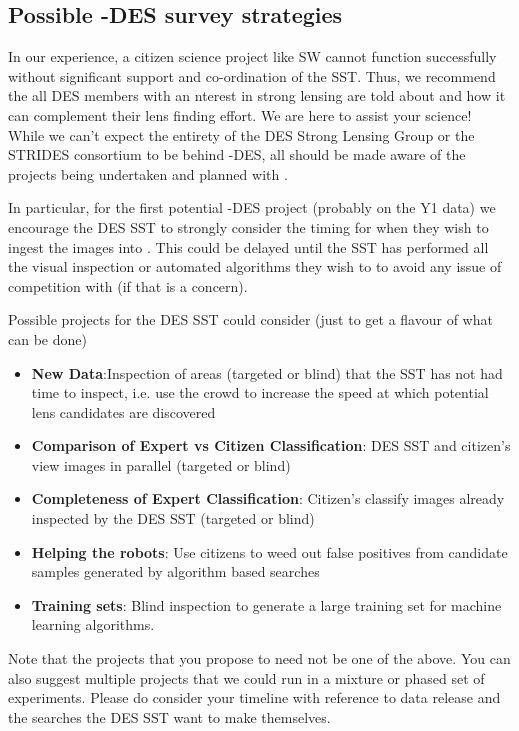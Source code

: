 \documentclass[a4paper,twocolumn]{article}
\begin{document}
\subsection{Possible \SW-DES survey strategies}

In our experience, a citizen science project like SW cannot function successfully without significant support and co-ordination of the SST. Thus, we recommend the all DES members with an nterest in strong lensing are told about \SW and how it can complement their lens finding effort. We are here to assist your science! While we can't expect the entirety of the DES Strong Lensing Group or the STRIDES consortium to be behind \SW-DES, all should be made aware of the projects being undertaken and planned with \SW.

In particular, for the first potential \SW-DES project (probably on the Y1 data) we encourage the DES SST to strongly consider the timing for when they wish to ingest the images into \SW. This could be delayed until the SST has performed all the visual inspection or automated algorithms they wish to to avoid any issue of competition with \SW (if that is a concern).

Possible projects for the DES SST could consider (just to get a flavour of what can be done)
\begin{itemize}
\item \textbf{New Data}:Inspection of areas (targeted or blind) that the SST has not had time to inspect, i.e. use the crowd to increase the speed at which potential lens candidates are discovered
\item \textbf{Comparison of Expert vs Citizen Classification}: DES SST and citizen's view images in parallel (targeted or blind)
\item \textbf{Completeness of Expert Classification}: Citizen's classify images already inspected by the DES SST (targeted or blind)
\item \textbf{Helping the robots}: Use citizens to weed out false positives from candidate samples generated by algorithm based searches
\item \textbf{Training sets}: Blind inspection to generate a large training set for  machine learning algorithms.
\end{itemize}

Note that the projects that you propose to \SW need not be one of the above. You can also suggest multiple projects that we could run in a mixture or phased set of experiments. Please do consider your timeline with reference to data release and the searches the DES SST want to make themselves.
\end{document}

